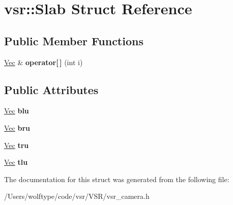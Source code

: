 \hypertarget{structvsr_1_1_slab}{\section{vsr\-:\-:Slab Struct Reference}
\label{structvsr_1_1_slab}
}
\subsection*{Public Member Functions}
\begin{DoxyCompactItemize}
\item 
\hypertarget{structvsr_1_1_slab_a208fa51f3c4365e509f3989fa046e329}{\hyperlink{namespacevsr_a0d061c30ac198a710a1b92dd8b343273}{Vec} \& {\bfseries operator\mbox{[}$\,$\mbox{]}} (int i)}\label{structvsr_1_1_slab_a208fa51f3c4365e509f3989fa046e329}

\end{DoxyCompactItemize}
\subsection*{Public Attributes}
\begin{DoxyCompactItemize}
\item 
\hypertarget{structvsr_1_1_slab_a5fa07c3945f2905f8c4e8e4ca92ca6e1}{\hyperlink{namespacevsr_a0d061c30ac198a710a1b92dd8b343273}{Vec} {\bfseries blu}}\label{structvsr_1_1_slab_a5fa07c3945f2905f8c4e8e4ca92ca6e1}

\item 
\hypertarget{structvsr_1_1_slab_a132fda59a05d60fb71cdc71e2f5077e1}{\hyperlink{namespacevsr_a0d061c30ac198a710a1b92dd8b343273}{Vec} {\bfseries bru}}\label{structvsr_1_1_slab_a132fda59a05d60fb71cdc71e2f5077e1}

\item 
\hypertarget{structvsr_1_1_slab_ac5e514edb875307b30faf414ae734110}{\hyperlink{namespacevsr_a0d061c30ac198a710a1b92dd8b343273}{Vec} {\bfseries tru}}\label{structvsr_1_1_slab_ac5e514edb875307b30faf414ae734110}

\item 
\hypertarget{structvsr_1_1_slab_add4b2bbb05398ba83031f61aec45118f}{\hyperlink{namespacevsr_a0d061c30ac198a710a1b92dd8b343273}{Vec} {\bfseries tlu}}\label{structvsr_1_1_slab_add4b2bbb05398ba83031f61aec45118f}

\end{DoxyCompactItemize}


The documentation for this struct was generated from the following file\-:\begin{DoxyCompactItemize}
\item 
/\-Users/wolftype/code/vsr/\-V\-S\-R/vsr\-\_\-camera.\-h\end{DoxyCompactItemize}
